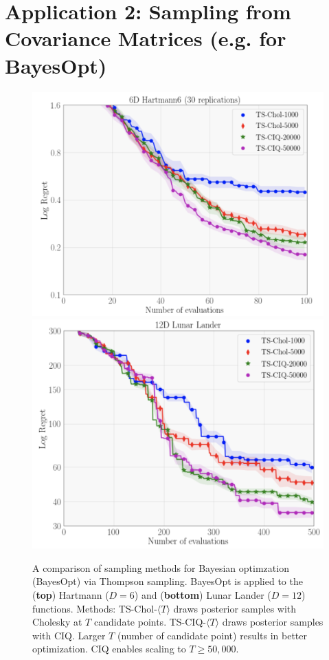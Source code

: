 \section{Application 2: Sampling from Covariance Matrices (e.g. for BayesOpt)}


\begin{figure}[t!]
  \centering
  \includegraphics[width=0.72\linewidth]{figures/hartmann6.png}
  \includegraphics[width=0.7\linewidth]{figures/lunar_lander.png}
  \caption[
    A comparison of sampling methods for Bayesian optimzation (BayesOpt) via Thompson sampling.
    BayesOpt is applied to the Hartmann ($D=6$) and Lunar Lander ($D=12$) functions.
  ]{
    A comparison of sampling methods for Bayesian optimzation (BayesOpt) via Thompson sampling.
    BayesOpt is applied to the ({\bf top}) Hartmann ($D=6$) and ({\bf bottom}) Lunar Lander ($D=12$) functions.
    Methods: TS-Chol-$\langle T \rangle$ draws posterior samples with Cholesky at $T$ candidate points.
    TS-CIQ-$\langle T \rangle$ draws posterior samples with CIQ.
    Larger $T$ (number of candidate point) results in better optimization.
    CIQ enables scaling to $T\geq50,\!000$.
  }
  \label{fig:hartmann6}
\end{figure}

